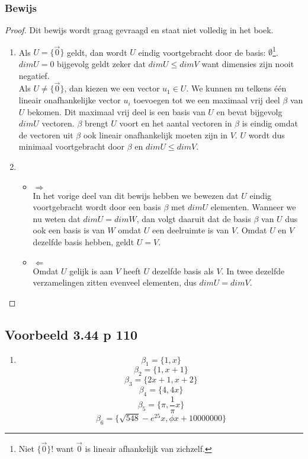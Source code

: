 \documentclass[lineaire_algebra_oplossingen.tex]{subfiles}
\begin{document}
\subsubsection*{Bewijs}
\begin{proof}
Dit bewijs wordt graag gevraagd en staat niet volledig in het boek.
\begin{enumerate}
\item
Als $U=\{\vec{0}\}$ geldt, dan wordt $U$ eindig voortgebracht door de basis: $\emptyset$\footnote{Niet $\{\vec{0}\}$! want $\vec{0}$ is lineair afhankelijk van zichzelf.}. $dimU = 0$ bijgevolg geldt zeker dat $dimU\le dimV$ want dimensies zijn nooit negatief.\\
Als $U \neq \{\vec{0}\}$, dan kiezen we een vector $u_1 \in U$. We kunnen nu telkens \'e\'en lineair onafhankelijke vector $u_i$ toevoegen tot we een maximaal vrij deel $\beta$ van $U$ bekomen. Dit maximaal vrij deel is een basis van $U$ en bevat bijgevolg $dimU$ vectoren. $\beta$ brengt $U$ voort en het aantal vectoren in $\beta$ is eindig omdat de vectoren uit $\beta$ ook lineair onafhankelijk moeten zijn in $V$. $U$ wordt dus minimaal voortgebracht door $\beta$ en $dimU \le dimV$.
\item
\begin{itemize}
\item $\Rightarrow$\\
In het vorige deel van dit bewijs hebben we bewezen dat $U$ eindig voortgebracht wordt door een basis $\beta$ met $dimU$ elementen. Wanneer we nu weten dat $dimU=dimW$, dan volgt daaruit dat de basis $\beta$ van $U$ dus ook een basis is van $W$ omdat $U$ een deelruimte is van $V$. Omdat $U$ en $V$ dezelfde basis hebben, geldt $U = V$.
\item $\Leftarrow$\\
Omdat $U$ gelijk is aan $V$ heeft $U$ dezelfde basis als $V$. In twee dezelfde verzamelingen zitten evenveel elementen, dus $dimU=dimV$.
\end{itemize}
\end{enumerate}
\end{proof}


\subsection{Voorbeeld 3.44 p 110}
\label{3.44}
\begin{enumerate}
\item
\[
\beta_1 = \{1,x\}
\]
\[
\beta_2 = \{1,x+1\}
\]
\[
\beta_3 = \{2x+1,x+2\}
\]
\[
\beta_4 = \{4,4x\}
\]
\[
\beta_5 = \{\pi,\frac{1}{\pi}x\}
\]
\[
\beta_6 = \{\sqrt{548}-e^{25}x,\phi x + 10000000\}
\]
\end{enumerate}
\end{document}
